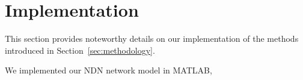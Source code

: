 \section{Implementation}
\label{sec:impl}

This section provides noteworthy details on our implementation of the methods 
introduced in Section~\ref{sec:methodology}.\vertbreak

We implemented our NDN network model in MATLAB, 


